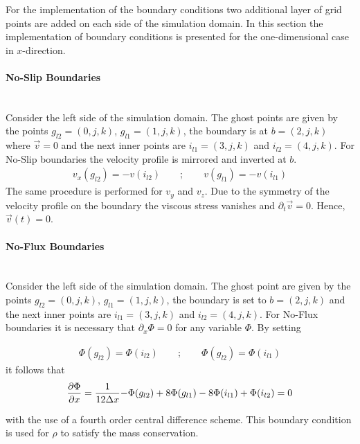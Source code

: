 For the implementation of the boundary conditions two additional layer of grid points are added on each side of the simulation domain.
In this section the implementation of boundary conditions is presented for the one-dimensional case in $x$-direction.

\paragraph{No-Slip Boundaries}\mbox{}\\

Consider the left side of the simulation domain.
The ghost points are given by the points ${g_{l2}=(0, j, k)}$, ${g_{l1}=(1, j, k)}$,
the boundary is at ${b=(2, j, k)}$ where $\vec{v}=0$ and the next inner points are
$i_{l1}=(3, j, k)$ and $i_{l2}=(4, j, k)$.
For No-Slip boundaries the velocity profile is mirrored and inverted at $b$.
\begin{align}
    v_x(g_{l2}) = -v(i_{l2}) \qquad ; \qquad v(g_{l1}) = -v(i_{l1})
\end{align}
The same procedure is performed for $v_y$ and $v_z$.
Due to the symmetry of the velocity profile on the boundary the viscous stress vanishes and $\partial_t\vec{v} = 0$. Hence, $\vec{v}(t)=0$.


\paragraph{No-Flux Boundaries}\mbox{}\\

Consider the left side of the simulation domain.
The ghost point are given by the points ${g_{l2}=(0, j, k)}$, ${g_{l1}=(1, j, k)}$,
the boundary is set to  ${b=(2, j, k)}$ and the next inner points are
$i_{l1}=(3, j, k)$ and $i_{l2}=(4, j, k)$.
For No-Flux boundaries it is necessary that $\partial_x\Phi = 0$ for any variable $\Phi$.
By setting

\begin{align}
    \Phi(g_{l2}) = \Phi(i_{l2})\qquad ; \qquad \Phi(g_{l2}) = \Phi(i_{l1})
\end{align}
it follows that
\begin{align}
    \pdn[\Phi]{x} = \frac{1}{12\Delta x}{-\Phi(g_{l2})+8\Phi(g_{l1}) -8\Phi(i_{l1}) + \Phi(i_{l2})} = 0
\end{align}

with the use of a fourth order central difference scheme.
This boundary condition is used for $\rho$ to satisfy the mass conservation.

